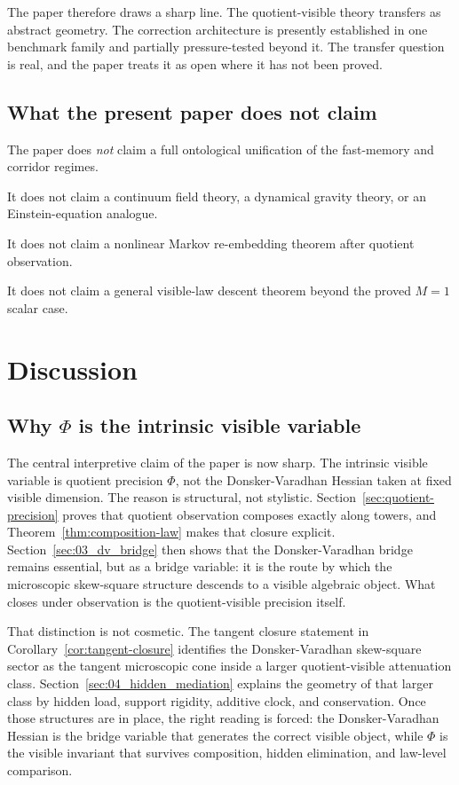 \documentclass[11pt]{article}
\numberwithin{equation}{section}
\theoremstyle{thmcompact}
\theoremstyle{remark}
\begin{document}
The paper therefore draws a sharp line. The quotient-visible theory transfers as abstract geometry. The correction architecture is presently established in one benchmark family and partially pressure-tested beyond it. The transfer question is real, and the paper treats it as open where it has not been proved.

\subsection{What the present paper does not claim}

The paper does \textit{not} claim a full ontological unification of the fast-memory and corridor regimes.

It does not claim a continuum field theory, a dynamical gravity theory, or an Einstein-equation analogue.

It does not claim a nonlinear Markov re-embedding theorem after quotient observation.

It does not claim a general visible-law descent theorem beyond the proved $M=1$ scalar case.

\section{Discussion}
\label{sec:13_discussion}

\subsection{Why $\Phi$ is the intrinsic visible variable}

The central interpretive claim of the paper is now sharp. The intrinsic visible variable is quotient precision $\Phi$, not the Donsker-Varadhan Hessian taken at fixed visible dimension. The reason is structural, not stylistic. Section~\ref{sec:quotient-precision} proves that quotient observation composes exactly along towers, and Theorem~\ref{thm:composition-law} makes that closure explicit. Section~\ref{sec:03_dv_bridge} then shows that the Donsker-Varadhan bridge remains essential, but as a bridge variable: it is the route by which the microscopic skew-square structure descends to a visible algebraic object. What closes under observation is the quotient-visible precision itself.

That distinction is not cosmetic. The tangent closure statement in Corollary~\ref{cor:tangent-closure} identifies the Donsker-Varadhan skew-square sector as the tangent microscopic cone inside a larger quotient-visible attenuation class. Section~\ref{sec:04_hidden_mediation} explains the geometry of that larger class by hidden load, support rigidity, additive clock, and conservation. Once those structures are in place, the right reading is forced: the Donsker-Varadhan Hessian is the bridge variable that generates the correct visible object, while $\Phi$ is the visible invariant that survives composition, hidden elimination, and law-level comparison.
\end{document}
